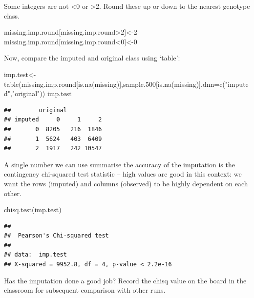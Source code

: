 \documentclass[
]{book}
\newenvironment{Shaded}{\begin{snugshade}}{\end{snugshade}}
\newcommand{\AttributeTok}[1]{\textcolor[rgb]{0.77,0.63,0.00}{#1}}
\newcommand{\DecValTok}[1]{\textcolor[rgb]{0.00,0.00,0.81}{#1}}
\newcommand{\FloatTok}[1]{\textcolor[rgb]{0.00,0.00,0.81}{#1}}
\newcommand{\FunctionTok}[1]{\textcolor[rgb]{0.00,0.00,0.00}{#1}}
\newcommand{\NormalTok}[1]{#1}
\newcommand{\OtherTok}[1]{\textcolor[rgb]{0.56,0.35,0.01}{#1}}
\newcommand{\SpecialCharTok}[1]{\textcolor[rgb]{0.00,0.00,0.00}{#1}}
\newcommand{\StringTok}[1]{\textcolor[rgb]{0.31,0.60,0.02}{#1}}
\begin{document}
Some integers are not \textless0 or \textgreater2. Round these up or down to the nearest genotype class.

\begin{Shaded}
\begin{Highlighting}[]
\NormalTok{missing.imp.round[missing.imp.round}\SpecialCharTok{\textgreater{}}\DecValTok{2}\NormalTok{]}\OtherTok{\textless{}{-}}\DecValTok{2}
\NormalTok{missing.imp.round[missing.imp.round}\SpecialCharTok{\textless{}}\DecValTok{0}\NormalTok{]}\OtherTok{\textless{}{-}}\DecValTok{0}
\end{Highlighting}
\end{Shaded}

Now, compare the imputed and original class using `table':

\begin{Shaded}
\begin{Highlighting}[]
\NormalTok{imp.test}\OtherTok{\textless{}{-}}\FunctionTok{table}\NormalTok{(missing.imp.round[}\FunctionTok{is.na}\NormalTok{(missing)],sample}\FloatTok{.500}\NormalTok{[}\FunctionTok{is.na}\NormalTok{(missing)],}\AttributeTok{dnn=}\FunctionTok{c}\NormalTok{(}\StringTok{"imputed"}\NormalTok{,}\StringTok{"original"}\NormalTok{))}
\NormalTok{imp.test}
\end{Highlighting}
\end{Shaded}

\begin{verbatim}
##        original
## imputed     0     1     2
##       0  8205   216  1846
##       1  5624   403  6409
##       2  1917   242 10547
\end{verbatim}

A single number we can use summarise the accuracy of the imputation is the contingency chi-squared test statistic -- high values are good in this context: we want the rows (imputed) and columns (observed) to be highly dependent on each other.

\begin{Shaded}
\begin{Highlighting}[]
\FunctionTok{chisq.test}\NormalTok{(imp.test) }
\end{Highlighting}
\end{Shaded}

\begin{verbatim}
## 
##  Pearson's Chi-squared test
## 
## data:  imp.test
## X-squared = 9952.8, df = 4, p-value < 2.2e-16
\end{verbatim}

Has the imputation done a good job? Record the chisq value on the board in the classroom for subsequent comparison with other runs.
\end{document}
